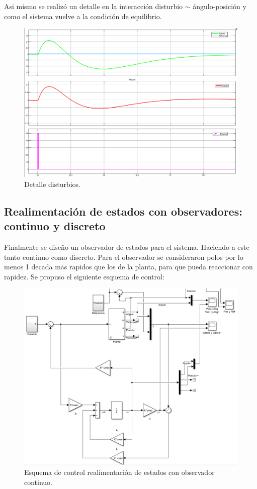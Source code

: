 Asi mismo se realizó un detalle en la interacción disturbio $\sim$ ángulo-posici\'on y como el sistema vuelve a la condici\'on de equilibrio.
\begin{figure}[H]
	\centering
	\includegraphics[width=1\linewidth]{Imagenes/Control_por_realimentacion/detalle_disturbio.png}
	\caption{Detalle disturbios.}
	\label{realmentacion_disturbio}
\end{figure}


 \subsection{Realimentaci\'on de estados con observadores: continuo y discreto}
Finalmente se diseño un observador de estados  para el sistema. Haciendo a este tanto continuo como discreto.
Para el observador se consideraron polos por lo menos 1 decada mas rapidos que los de la planta, para que pueda reaccionar con rapidez.
Se propuso el siguiente esquema de control:
\begin{figure}[H]
	\centering
	\includegraphics[width=1\linewidth]{Imagenes/Esquema_general_obs.png}
	\caption{Esquema de control realimentación de estados con observador continuo.}
	\label{esqcontobs}
\end{figure}

